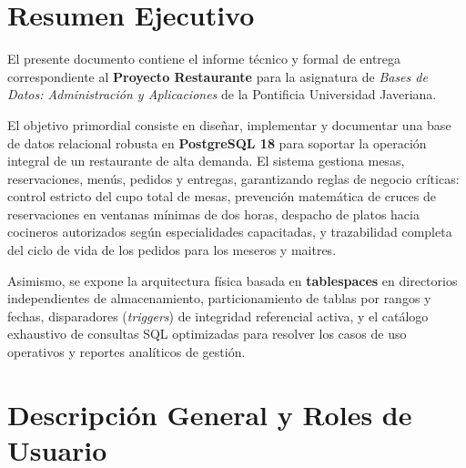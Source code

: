 \documentclass[11pt,letterpaper]{article}
\begin{document}
\setcounter{page}{1}

\section*{Resumen Ejecutivo}
El presente documento contiene el informe técnico y formal de entrega correspondiente al \textbf{Proyecto Restaurante} para la asignatura de \textit{Bases de Datos: Administración y Aplicaciones} de la Pontificia Universidad Javeriana. 

El objetivo primordial consiste en diseñar, implementar y documentar una base de datos relacional robusta en \textbf{PostgreSQL 18} para soportar la operación integral de un restaurante de alta demanda. El sistema gestiona mesas, reservaciones, menús, pedidos y entregas, garantizando reglas de negocio críticas: control estricto del cupo total de mesas, prevención matemática de cruces de reservaciones en ventanas mínimas de dos horas, despacho de platos hacia cocineros autorizados según especialidades capacitadas, y trazabilidad completa del ciclo de vida de los pedidos para los meseros y maitres.

Asimismo, se expone la arquitectura física basada en \textbf{tablespaces} en directorios independientes de almacenamiento, particionamiento de tablas por rangos y fechas, disparadores (\textit{triggers}) de integridad referencial activa, y el catálogo exhaustivo de consultas SQL optimizadas para resolver los casos de uso operativos y reportes analíticos de gestión.

\vspace{0.8cm}
\tableofcontents
\newpage
\listoftables
\newpage

\setcounter{page}{1}

\section{Descripción General y Roles de Usuario}
\end{document}
